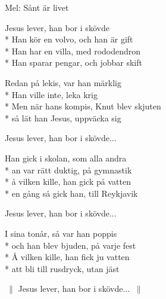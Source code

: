 \begin{SongText}
    \begin{SongInfo}
        Mel: Sånt är livet
    \end{SongInfo}
    \begin{SongVerse}
        Jesus lever, han bor i skövde\\*%
        Han kör en volvo, och han är gift\\*%
        Han har en villa, med rododendron\\*%
        Han sparar pengar, och jobbar skift
    \end{SongVerse}
    \begin{SongVerse}
        Redan på lekis, var han märklig\\*%
        Han ville inte, leka krig\\*%
        Men när hans kompis, Knut blev skjuten\\*%
        så lät han Jesus, uppväcka sig
    \end{SongVerse}
    \begin{SongVerse}
        Jesus lever, han bor i skövde...
    \end{SongVerse}
    \begin{SongVerse}
        Han gick i skolan, som alla andra\\*%
        an var rätt duktig, på gymnastik\\*%
        å vilken kille, han gick på vatten\\*%
        en gång så gick han, till Reykjavik
    \end{SongVerse}
    \begin{SongVerse}
        Jesus lever, han bor i skövde...
    \end{SongVerse}
    \begin{SongVerse}
        I sina tonår, så var han poppis\\*%
        och han blev bjuden, på varje fest\\*%
        Å vilken kille, han fick ju vatten \\*%
        att bli till rusdryck, utan jäst
    \end{SongVerse}
    \begin{SongVerse}
        $\:\|$ Jesus lever, han bor i skövde... $\:\|$
    \end{SongVerse}
\end{SongText}
